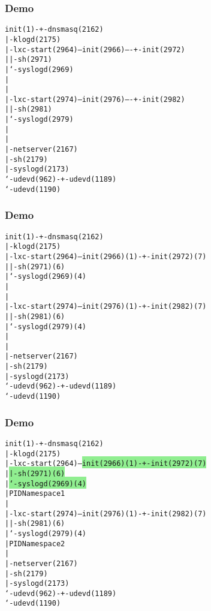 \documentclass{beamer}
\newcommand{\colorwrevert}[2]{\color{#1}#2\color{Black}}
\begin{document}
\begin{frame}[fragile]
\frametitle{Demo}
\begin{alltt}\footnotesize
init(1)-+-dnsmasq(2162)
        |-klogd(2175)
        |-lxc-start(2964)---init(2966)----+-init(2972)
        |                                 |-sh(2971)
        |                                 `-syslogd(2969)
        |
        |
        |-lxc-start(2974)---init(2976)----+-init(2982)
        |                                 |-sh(2981)
        |                                 `-syslogd(2979)
        |
        |
        |-netserver(2167)
        |-sh(2179)
        |-syslogd(2173)
        `-udevd(962)-+-udevd(1189)
                     `-udevd(1190)
\end{alltt}\normalsize
\end{frame}

\begin{frame}[fragile]
\frametitle{Demo}
\begin{alltt}\footnotesize
init(1)-+-dnsmasq(2162)
        |-klogd(2175)
        |-lxc-start(2964)---init(2966)\colorwrevert{Green}{(1)}-+-init(2972)\colorwrevert{Green}{(7)}
        |                                 |-sh(2971)\colorwrevert{Green}{(6)}
        |                                 `-syslogd(2969)\colorwrevert{Green}{(4)}
        |
        |
        |-lxc-start(2974)---init(2976)\colorwrevert{Red}{(1)}-+-init(2982)\colorwrevert{Red}{(7)}
        |                                 |-sh(2981)\colorwrevert{Red}{(6)}
        |                                 `-syslogd(2979)\colorwrevert{Red}{(4)}
        |
        |
        |-netserver(2167)
        |-sh(2179)
        |-syslogd(2173)
        `-udevd(962)-+-udevd(1189)
                     `-udevd(1190)
\end{alltt}\normalsize
\end{frame}

\begin{frame}[fragile]
\frametitle{Demo}
\begin{alltt}\footnotesize
init(1)-+-dnsmasq(2162)
        |-klogd(2175)
        |-lxc-start(2964)---\colorbox{LightGreen}{init(2966)\colorwrevert{Green}{(1)}-+-init(2972)\colorwrevert{Green}{(7)}    }
        |                   \colorbox{LightGreen}{              |-sh(2971)\colorwrevert{Green}{(6)}      }
        |                   \colorbox{LightGreen}{              `-syslogd(2969)\colorwrevert{Green}{(4)} }
        |                   \colorwrevert{Green}{PID Namespace 1}
        |
        |-lxc-start(2974)---\colorbox{LightRed}{init(2976)\colorwrevert{Red}{(1)}-+-init(2982)\colorwrevert{Red}{(7)}    }
        |                   \colorbox{LightRed}{              |-sh(2981)\colorwrevert{Red}{(6)}      }
        |                   \colorbox{LightRed}{              `-syslogd(2979)\colorwrevert{Red}{(4)} }
        |                   \colorwrevert{Red}{PID Namespace 2}
        |
        |-netserver(2167)
        |-sh(2179)
        |-syslogd(2173)
        `-udevd(962)-+-udevd(1189)
                     `-udevd(1190)
\end{alltt}\normalsize
\end{frame}
\end{document}
